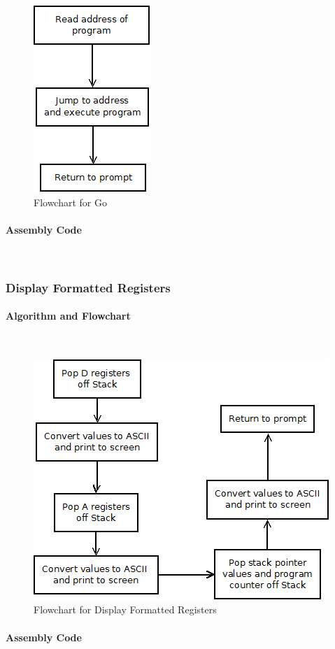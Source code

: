 \documentclass[12pt]{article}
\begin{document}
			
\begin{figure}[H]
\centering
\includegraphics[width=0.2\linewidth]{Go}
\caption{Flowchart for Go}
\label{fig:Go}
\end{figure}
			\paragraph{Assembly Code}~\\				%
			
			\subsubsection{Display Formatted Registers}
			\paragraph{Algorithm and Flowchart}~\\
			
			
			
\begin{figure}[H]
\centering
\includegraphics[width=0.7\linewidth]{DF}
\caption{Flowchart for Display Formatted Registers}
\label{fig:DF}
\end{figure}
			\paragraph{Assembly Code}~\\				%
			
\end{document}
